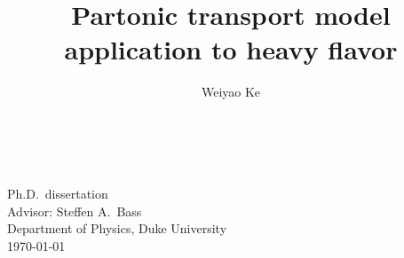 \documentclass[11pt,letterpaper,oneside,openany]{book}
\title{Partonic transport model application to heavy flavor}
\author{Weiyao Ke}
\begin{document}
\frontmatter

\makeatletter

\begin{titlepage}
  \centering
  \sffamily
  \vspace*{.25\textheight}
  \Huge\@title \\
  \vspace{.05\textheight}
  \LARGE\@author \\
  \vspace{.05\textheight}
  \Large Ph.D.\ dissertation \\[.25ex]
  Advisor: Steffen A.\ Bass \\[.25ex]
  Department of Physics, Duke University \\
  \vspace{.05\textheight}
  \today
\end{titlepage}
\makeatother

%

\titlespacing{\chapter}{0pt}{-45pt}{30pt}
\setcounter{tocdepth}{1}
\titlespacing{\chapter}{0pt}{50pt}{40pt}

\mainmatter
{}
\tableofcontents










\backmatter

{\raggedright\printbibliography[heading=bibintoc, title={dissertation}]}
\end{document}
